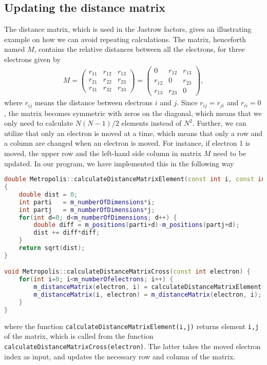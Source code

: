 \subsection{Updating the distance matrix} \label{sec:distancematrix}
The distance matrix, which is used in the Jastrow factors, gives an illustrating example on how we can avoid repeating calculations. The matrix, henceforth named $M$, contains the relative distances between all the electrons, for three electrons given by
\begin{eqnarray}
M=
\begin{pmatrix}
r_{11} & r_{12} & r_{13} \\
r_{21} & r_{22} & r_{23} \\
r_{31} & r_{32} & r_{33}
\end{pmatrix}
=
\begin{pmatrix}
0 & r_{12} & r_{13} \\
r_{12} & 0 & r_{23} \\
r_{13} & r_{23} & 0
\end{pmatrix},
\end{eqnarray}
where $r_{ij}$ means the distance between electrons $i$ and $j$. Since $r_{ij}=r_{ji}$ and $r_{ii}=0$, the matrix becomes symmetric with zeros on the diagonal, which means that we only need to calculate $N(N-1)/2$ elements instead of $N^2$. Further, we can utilize that only an electron is moved at a time, which means that only a row and a column are changed when an electron is moved. For instance, if electron 1 is moved, the upper row and the left-hand side column in matrix $M$ need to be updated. In our program, we have implemented this in the following way
\lstset{basicstyle=\scriptsize}
\begin{lstlisting}[language=c++]
double Metropolis::calculateDistanceMatrixElement(const int i, const int j) 
{
	double dist = 0;
	int parti   = m_numberOfDimensions*i;
	int partj   = m_numberOfDimensions*j;
	for(int d=0; d<m_numberOfDimensions; d++) {
		double diff = m_positions(parti+d)-m_positions(partj+d);
		dist += diff*diff;
	}
	return sqrt(dist);
}

void Metropolis::calculateDistanceMatrixCross(const int electron) {
	for(int i=0; i<m_numberOfelectrons; i++) {
		m_distanceMatrix(electron, i) = calculateDistanceMatrixElement(electron, i);
		m_distanceMatrix(i, electron) = m_distanceMatrix(electron, i);
	}
}
\end{lstlisting}
where the function \lstinline{calculateDistanceMatrixElement(i,j)} returns element \lstinline{i,j} of the matrix, which is called from the function \lstinline{calculateDistanceMatrixCross(electron)}. The latter takes the moved electron index as input, and updates the necessary row and column of the matrix. 

